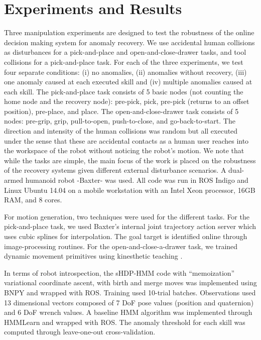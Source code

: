\documentclass[letterpaper, 10 pt, conference]{ieeeconf}  %
\begin{document}
\section{Experiments and Results} \label{sec:experiments}
Three manipulation experiments are designed to test the robustness of the online decision making system for anomaly recovery. We use accidental human collisions as disturbances for a pick-and-place and open-and-close-drawer tasks, and tool collisions for a pick-and-place task. For each of the three experiments, we test four separate conditions: (i) no anomalies, (ii) anomalies without recovery, (iii) one anomaly caused at each executed skill and (iv) multiple anomalies caused at each skill. The pick-and-place task consists of 5 basic nodes (not counting the home node and the recovery node): pre-pick, pick, pre-pick (returns to an offset position), pre-place, and place. The open-and-close-drawer task consists of 5 nodes: pre-grip, grip, pull-to-open, push-to-close, and go-back-to-start. The direction and intensity of the human collisions was random but all executed under the sense that these are accidental contacts as a human user reaches into the workspace of the robot without noticing the robot's motion. We note that while the tasks are simple, the main focus of the work is placed on the robustness of the recovery systems given different external disturbance scenarios.
A dual-armed humanoid robot -Baxter- was used. All code was run in ROS Indigo and Linux Ubuntu 14.04 on a mobile workstation with an Intel Xeon processor, 16GB RAM, and 8 cores. 

For motion generation, two techniques were used for the different tasks. For the pick-and-place task, we used Baxter's internal joint trajectory action server which uses cubic splines for interpolation. The goal target is identified online through image-processing routines. For the open-and-close-a-drawer task, we trained dynamic movement primitives using kinesthetic teaching \cite{2013NC-Ijspeertdynamical-CMP_LrnAttracMdls_MtrBeh}.

In terms of robot introspection, the sHDP-HMM code with ``memoization'' variational coordinate ascent, with birth and merge moves was implemented using BNPY \cite{bnpy} and wrapped with ROS. Training used 10-trial batches. Observations used 13 dimensional vectors composed of 7 DoF pose values (position and quaternion) and 6 DoF wrench values. A baseline HMM algorithm was implemented through HMMLearn \cite{hmmlearn} and wrapped with ROS. 
The anomaly threshold for each skill was computed through leave-one-out cross-validation.
\end{document}
